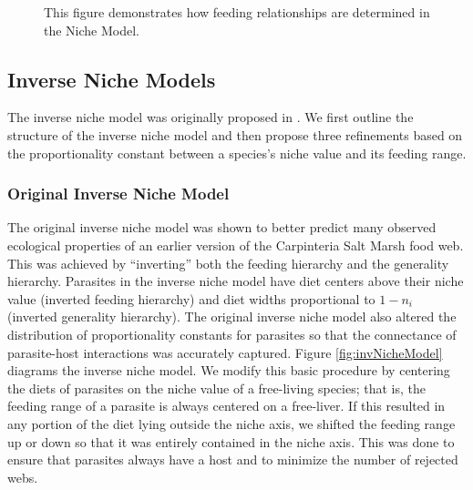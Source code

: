 \documentclass[/home/nkappler/Research/Dissertation/
 dissertation.tex]{subfiles}
\begin{document}
\begin{bibunit}
\begin{figure}
    \centering
    \caption[Niche model diagram]{This figure demonstrates how feeding relationships are determined
    in the Niche Model.\label{fig:nicheModel}}
\end{figure}


\subsection{Inverse Niche Models}
The inverse niche model was originally proposed in \cite*{Warren2010}. We first
outline the structure of the inverse niche model and then propose three
refinements based on the proportionality constant between a species's niche value
and its feeding range.

\subsubsection{Original Inverse Niche Model} 

The original inverse niche model was shown to better predict many observed
ecological properties of an earlier version of the Carpinteria Salt Marsh food
web. This was achieved by ``inverting'' both the feeding hierarchy and the
generality hierarchy.  Parasites in the inverse niche model have diet centers
above their niche value (inverted feeding hierarchy) and diet widths
proportional to $1-n_i$ (inverted generality hierarchy). The original inverse
niche model also altered the distribution of proportionality constants for
parasites so that the connectance of parasite-host interactions was accurately
captured. Figure \ref{fig:invNicheModel} diagrams the inverse niche model. We
modify this basic procedure by centering the diets of parasites on the niche
value of a free-living species; that is, the feeding range of a parasite is
always centered on a free-liver. If this resulted in any portion of the diet
lying outside the niche axis, we shifted the feeding range up or down so that
it was entirely contained in the niche axis. This was done to ensure that
parasites always have a host and to minimize the number of rejected webs.



\end{bibunit}
\end{document}

